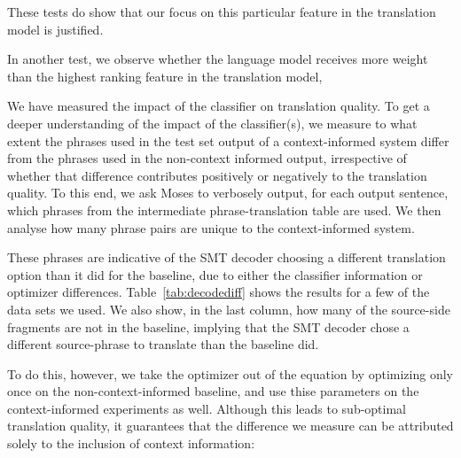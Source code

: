 These tests do show that our focus on this particular feature in the
translation model is justified.

In another test, we observe whether the language model receives more weight than the highest
ranking feature in the translation model, 

We have measured the impact of the classifier on translation quality.  To get a
deeper understanding of the impact of the classifier(s), we measure to what
extent the phrases used in the test set output of a context-informed system
differ from the phrases used in the non-context informed output, irrespective
of whether that difference contributes positively or negatively to the
translation quality. To this end, we ask Moses to verbosely output, for each
output sentence, which phrases from the intermediate phrase-translation table
are used. We then analyse how many phrase pairs are unique to the
context-informed system.

These phrases are indicative of the SMT decoder
choosing a different translation option than it did for the baseline, due to
either the classifier information or optimizer differences.
Table~\ref{tab:decodediff} shows the results for a few of the data sets we
used. We also show, in the last column, how many of the source-side fragments
are not in the baseline, implying that the SMT decoder chose a different
source-phrase to translate than the baseline did.

To do this, however, we take the optimizer out of the equation by optimizing
only once on the non-context-informed baseline, and use thise parameters on the
context-informed experiments as well. Although this leads to sub-optimal
translation quality, it guarantees that the difference we measure can be
attributed solely to the inclusion of context information:


